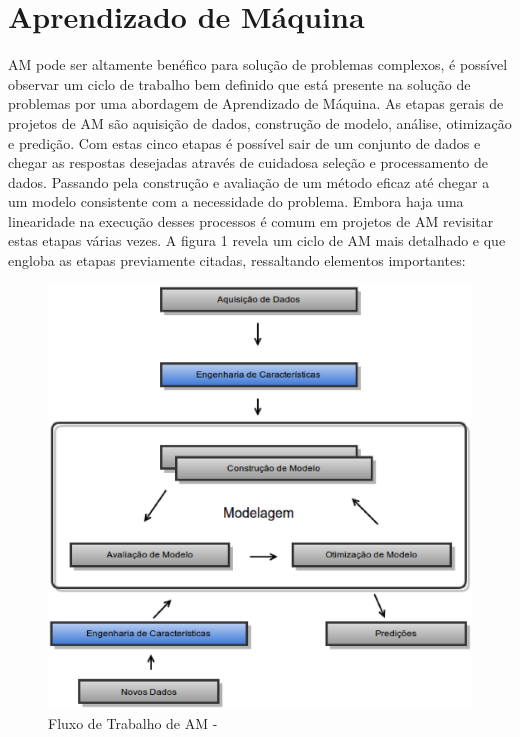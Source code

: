 \chapter{Aprendizado de Máquina}


AM pode ser altamente benéfico para solução de problemas complexos, é possível observar um ciclo de trabalho bem definido que está presente na solução de problemas por uma abordagem de Aprendizado de Máquina. As etapas gerais de projetos de AM são aquisição de dados, construção de modelo, análise, otimização e predição. Com estas cinco etapas é possível sair de um conjunto de dados e chegar as respostas desejadas através de cuidadosa seleção e processamento de dados. Passando pela construção e avaliação de um método eficaz até chegar a um modelo consistente com a necessidade do problema. Embora haja uma linearidade na execução desses processos é comum em projetos de AM revisitar estas etapas várias vezes. A figura 1 revela um ciclo de AM mais detalhado e que engloba as etapas previamente citadas, ressaltando elementos importantes: 

\begin{figure}[!h]
\centering
\includegraphics[keepaspectratio=true,scale=0.50]
{figuras/workflowml.eps}
\caption{Fluxo de Trabalho de AM - \cite{real2013}}
\label{workflow_am}
\end{figure}

